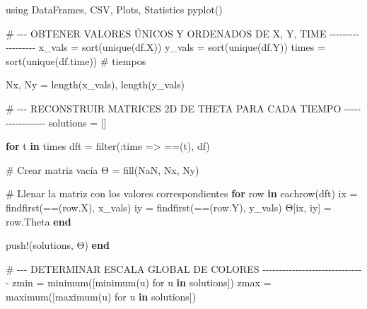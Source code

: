 \documentclass[
  spanish,
  us-letterpaper,
]{scrreprt}
\newenvironment{Shaded}{\begin{snugshade}}{\end{snugshade}}
\newcommand{\BuiltInTok}[1]{\textcolor[rgb]{0.00,0.23,0.31}{#1}}
\newcommand{\CommentTok}[1]{\textcolor[rgb]{0.37,0.37,0.37}{#1}}
\newcommand{\ConstantTok}[1]{\textcolor[rgb]{0.56,0.35,0.01}{#1}}
\newcommand{\ControlFlowTok}[1]{\textcolor[rgb]{0.00,0.23,0.31}{\textbf{#1}}}
\newcommand{\FunctionTok}[1]{\textcolor[rgb]{0.28,0.35,0.67}{#1}}
\newcommand{\ImportTok}[1]{\textcolor[rgb]{0.00,0.46,0.62}{#1}}
\newcommand{\KeywordTok}[1]{\textcolor[rgb]{0.00,0.23,0.31}{\textbf{#1}}}
\newcommand{\NormalTok}[1]{\textcolor[rgb]{0.00,0.23,0.31}{#1}}
\newcommand{\OperatorTok}[1]{\textcolor[rgb]{0.37,0.37,0.37}{#1}}
\theoremstyle{definition}
\theoremstyle{plain}
\theoremstyle{remark}
\begin{document}
\begin{Shaded}
\begin{Highlighting}[]
\ImportTok{using} \BuiltInTok{DataFrames}\NormalTok{, }\BuiltInTok{CSV}\NormalTok{, }\BuiltInTok{Plots}\NormalTok{, }\BuiltInTok{Statistics}
\FunctionTok{pyplot}\NormalTok{()}

\CommentTok{\# {-}{-}{-} OBTENER VALORES ÚNICOS Y ORDENADOS DE X, Y, TIME {-}{-}{-}{-}{-}{-}{-}{-}{-}{-}{-}{-}{-}{-}{-}{-}{-}{-}}
\NormalTok{x\_vals }\OperatorTok{=} \FunctionTok{sort}\NormalTok{(}\FunctionTok{unique}\NormalTok{(df.X))}
\NormalTok{y\_vals }\OperatorTok{=} \FunctionTok{sort}\NormalTok{(}\FunctionTok{unique}\NormalTok{(df.Y))}
\NormalTok{times }\OperatorTok{=} \FunctionTok{sort}\NormalTok{(}\FunctionTok{unique}\NormalTok{(df.time))  }\CommentTok{\# tiempos}

\NormalTok{Nx, Ny }\OperatorTok{=} \FunctionTok{length}\NormalTok{(x\_vals), }\FunctionTok{length}\NormalTok{(y\_vals)}

\CommentTok{\# {-}{-}{-} RECONSTRUIR MATRICES 2D DE THETA PARA CADA TIEMPO {-}{-}{-}{-}{-}{-}{-}{-}{-}{-}{-}{-}{-}{-}{-}{-}{-}}
\NormalTok{solutions }\OperatorTok{=}\NormalTok{ []}

\ControlFlowTok{for}\NormalTok{ t }\KeywordTok{in}\NormalTok{ times}
\NormalTok{    dft }\OperatorTok{=} \FunctionTok{filter}\NormalTok{(}\OperatorTok{:}\NormalTok{time }\OperatorTok{=\textgreater{}} \OperatorTok{==}\NormalTok{(t), df)}

    \CommentTok{\# Crear matriz vacía}
\NormalTok{    Θ }\OperatorTok{=} \FunctionTok{fill}\NormalTok{(}\ConstantTok{NaN}\NormalTok{, Nx, Ny)}

    \CommentTok{\# Llenar la matriz con los valores correspondientes}
    \ControlFlowTok{for}\NormalTok{ row }\KeywordTok{in} \FunctionTok{eachrow}\NormalTok{(dft)}
\NormalTok{        ix }\OperatorTok{=} \FunctionTok{findfirst}\NormalTok{(}\OperatorTok{==}\NormalTok{(row.X), x\_vals)}
\NormalTok{        iy }\OperatorTok{=} \FunctionTok{findfirst}\NormalTok{(}\OperatorTok{==}\NormalTok{(row.Y), y\_vals)}
\NormalTok{        Θ[ix, iy] }\OperatorTok{=}\NormalTok{ row.Theta}
    \ControlFlowTok{end}

    \FunctionTok{push!}\NormalTok{(solutions, Θ)}
\ControlFlowTok{end}

\CommentTok{\# {-}{-}{-} DETERMINAR ESCALA GLOBAL DE COLORES {-}{-}{-}{-}{-}{-}{-}{-}{-}{-}{-}{-}{-}{-}{-}{-}{-}{-}{-}{-}{-}{-}{-}{-}{-}{-}{-}{-}{-}{-}{-}}
\NormalTok{zmin }\OperatorTok{=} \FunctionTok{minimum}\NormalTok{([}\FunctionTok{minimum}\NormalTok{(u) for u }\KeywordTok{in}\NormalTok{ solutions])}
\NormalTok{zmax }\OperatorTok{=} \FunctionTok{maximum}\NormalTok{([}\FunctionTok{maximum}\NormalTok{(u) for u }\KeywordTok{in}\NormalTok{ solutions])}


\end{Highlighting}
\end{Shaded}
\end{document}
